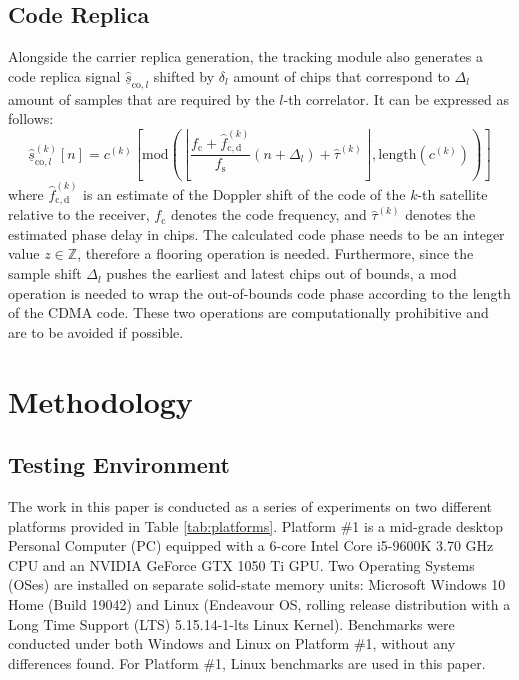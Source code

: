 \documentclass{juliacon}
\begin{document}
\subsection*{Code Replica}
Alongside the carrier replica generation, the tracking module also generates a code replica signal $\underline{\hat{s}}_{\mathrm{co}, l}$ shifted by $\delta_l$ amount of chips that correspond to $\Delta_l$ amount of samples that are required by the $l$-th correlator. It can be expressed as follows:
\begin{equation}\label{eqn:code-replica}
    \underline{\hat{s}}_{\mathrm{co}, l}^{(k)}[n] = c^{(k)}\left[ \mathrm{mod}\left(\left\lfloor\frac{f_{\mathrm{c}}+\hat{f}^{(k)}_{\mathrm{c}, \mathrm{d}}}{f_{\mathrm{s}}}(n+\Delta_l)+\hat{\tau}^{(k)}\right\rfloor, \mathrm{length}(c^{(k)})\right)  \right]
\end{equation}
where $\hat{f}^{(k)}_{\mathrm{c, d}}$ is an estimate of the Doppler shift of the code of the $k$-th satellite relative to the receiver, $f_{\mathrm{c}}$ denotes the code frequency, and $\hat{\tau}^{(k)}$ denotes the estimated phase delay in chips. The calculated code phase needs to be an integer value $z \in \mathbb{Z}$, therefore a flooring operation is needed. Furthermore, since the sample shift $\Delta_l$ pushes the earliest and latest chips out of bounds, a mod operation is needed to wrap the out-of-bounds code phase according to the length of the CDMA code. These two operations are computationally prohibitive and are to be avoided if possible.

\section{Methodology}\label{sec:methodology}

\subsection*{Testing Environment}
The work in this paper is conducted as a series of experiments on two different platforms provided in Table \ref{tab:platforms}. Platform \#1 is a mid-grade desktop Personal Computer (PC) equipped with a 6-core Intel Core i5-9600K 3.70 GHz CPU and an NVIDIA GeForce GTX 1050 Ti GPU. Two Operating Systems (OSes) are installed on separate solid-state memory units: Microsoft Windows 10 Home (Build 19042) and Linux (Endeavour OS, rolling release distribution with a Long Time Support (LTS) 5.15.14-1-lts Linux Kernel). Benchmarks were conducted under both Windows and Linux on Platform \#1, without any differences found. For Platform \#1, Linux benchmarks are used in this paper.
\end{document}
